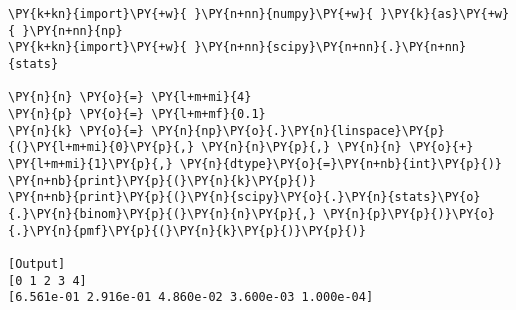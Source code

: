 \begin{Verbatim}[label=\makebox{\href{https://github.com/unipi-physics-labs/lab1-notes/tree/main/snippy/scipy.stats.binom.py}{https://github.com/.../scipy.stats.binom.py}},commandchars=\\\{\}]
\PY{k+kn}{import}\PY{+w}{ }\PY{n+nn}{numpy}\PY{+w}{ }\PY{k}{as}\PY{+w}{ }\PY{n+nn}{np}
\PY{k+kn}{import}\PY{+w}{ }\PY{n+nn}{scipy}\PY{n+nn}{.}\PY{n+nn}{stats}

\PY{n}{n} \PY{o}{=} \PY{l+m+mi}{4}
\PY{n}{p} \PY{o}{=} \PY{l+m+mf}{0.1}
\PY{n}{k} \PY{o}{=} \PY{n}{np}\PY{o}{.}\PY{n}{linspace}\PY{p}{(}\PY{l+m+mi}{0}\PY{p}{,} \PY{n}{n}\PY{p}{,} \PY{n}{n} \PY{o}{+} \PY{l+m+mi}{1}\PY{p}{,} \PY{n}{dtype}\PY{o}{=}\PY{n+nb}{int}\PY{p}{)}
\PY{n+nb}{print}\PY{p}{(}\PY{n}{k}\PY{p}{)}
\PY{n+nb}{print}\PY{p}{(}\PY{n}{scipy}\PY{o}{.}\PY{n}{stats}\PY{o}{.}\PY{n}{binom}\PY{p}{(}\PY{n}{n}\PY{p}{,} \PY{n}{p}\PY{p}{)}\PY{o}{.}\PY{n}{pmf}\PY{p}{(}\PY{n}{k}\PY{p}{)}\PY{p}{)}

[Output]
[0 1 2 3 4]
[6.561e-01 2.916e-01 4.860e-02 3.600e-03 1.000e-04]
\end{Verbatim}

